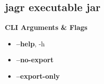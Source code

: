     \subsection{jagr executable jar}
    \begin{frame}[c]
        \slidehead
        \centering
        \vspace{-1em}
        \large
        \textbf{CLI Arguments \& Flags}
        \vspace{2em}
        \begin{itemize}[<+->]
            \item \textbf{--help}, -h
            \item \textbf{--no-export}
            \item \textbf{--export-only}
        \end{itemize}
    \end{frame}

